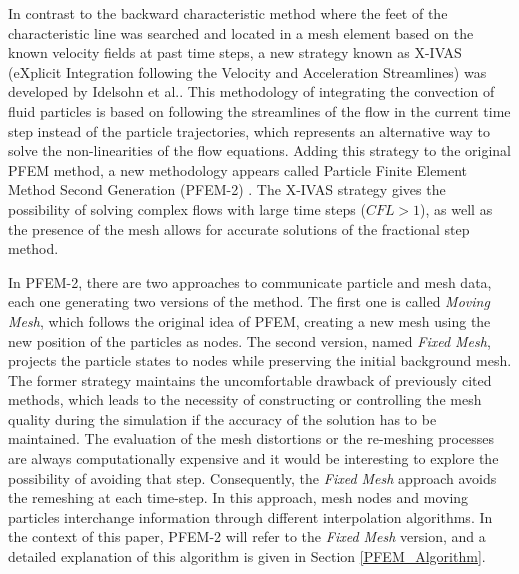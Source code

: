 In contrast to the backward characteristic method where the feet of the characteristic line was searched and located in a mesh element based on the known velocity fields at past time steps, a new strategy known as X-IVAS (eXplicit Integration following the Velocity and Acceleration Streamlines) was developed by Idelsohn et al.\cite{Idelsohn12}. This methodology of integrating the convection of fluid particles is based on following the streamlines of the flow in the current time step instead of the particle trajectories, which represents an alternative way to solve the non-linearities of the flow equations. Adding this strategy to the original PFEM method, a new methodology appears called Particle Finite Element Method Second Generation (PFEM-2) \cite{Idelsohn12b}. The X-IVAS strategy gives the possibility of solving complex flows with large time steps ($CFL>1$), as well as the presence of the mesh allows for accurate solutions of the fractional step method.

In PFEM-2, there are two approaches to communicate particle and mesh data, each one generating two versions of the method. The first one is called \textit{Moving Mesh}, which follows the original idea of PFEM, creating a new mesh using the new position of the particles as nodes. The second version, named \textit{Fixed Mesh}, projects the particle states to nodes while preserving the initial background mesh. The former strategy maintains the uncomfortable drawback of previously cited methods, which leads to the necessity of constructing or controlling the mesh quality during the simulation if the accuracy of the solution has to be maintained. The evaluation of the mesh distortions or the re-meshing processes are always computationally expensive and it would be interesting to explore the possibility of avoiding that step. Consequently, the \textit{Fixed Mesh} approach avoids the remeshing at each time-step. In this approach, mesh nodes and moving particles interchange information through different interpolation algorithms. In the context of this paper, PFEM-2 will refer to the \textit{Fixed Mesh} version, and a detailed explanation of this algorithm is given in Section \ref{PFEM_Algorithm}.


